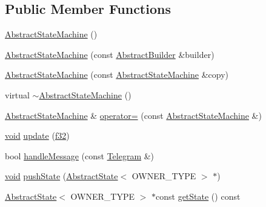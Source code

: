 \subsection*{Public Member Functions}
\begin{DoxyCompactItemize}
\item 
\mbox{\hyperlink{classnjli_1_1_abstract_state_machine_a9656442a1a93737e55b72cdb3f7f6cfd}{Abstract\+State\+Machine}} ()
\item 
\mbox{\hyperlink{classnjli_1_1_abstract_state_machine_a653f5257533125711c79d054265b1fa6}{Abstract\+State\+Machine}} (const \mbox{\hyperlink{classnjli_1_1_abstract_builder}{Abstract\+Builder}} \&builder)
\item 
\mbox{\hyperlink{classnjli_1_1_abstract_state_machine_abf78c27c17c84ed7e6e372714e7a87fc}{Abstract\+State\+Machine}} (const \mbox{\hyperlink{classnjli_1_1_abstract_state_machine}{Abstract\+State\+Machine}} \&copy)
\item 
virtual \mbox{\hyperlink{classnjli_1_1_abstract_state_machine_af05bef63fdcbaedd01df2657fe9b1e7b}{$\sim$\+Abstract\+State\+Machine}} ()
\item 
\mbox{\hyperlink{classnjli_1_1_abstract_state_machine}{Abstract\+State\+Machine}} \& \mbox{\hyperlink{classnjli_1_1_abstract_state_machine_af5d1c414f2ac3aba89c076461b404271}{operator=}} (const \mbox{\hyperlink{classnjli_1_1_abstract_state_machine}{Abstract\+State\+Machine}} \&)
\item 
\mbox{\hyperlink{_thread_8h_af1e856da2e658414cb2456cb6f7ebc66}{void}} \mbox{\hyperlink{classnjli_1_1_abstract_state_machine_af975fdfd08f9f6d93d739b12d1a06e52}{update}} (\mbox{\hyperlink{_util_8h_a5f6906312a689f27d70e9d086649d3fd}{f32}})
\item 
bool \mbox{\hyperlink{classnjli_1_1_abstract_state_machine_a7741c8bc8e0bf7d3d1b1e5310be6b5eb}{handle\+Message}} (const \mbox{\hyperlink{classnjli_1_1_telegram}{Telegram}} \&)
\item 
\mbox{\hyperlink{_thread_8h_af1e856da2e658414cb2456cb6f7ebc66}{void}} \mbox{\hyperlink{classnjli_1_1_abstract_state_machine_a0ef8fbf451f61eaccc97319751fe76c3}{push\+State}} (\mbox{\hyperlink{classnjli_1_1_abstract_state}{Abstract\+State}}$<$ O\+W\+N\+E\+R\+\_\+\+T\+Y\+PE $>$ $\ast$)
\item 
\mbox{\hyperlink{classnjli_1_1_abstract_state}{Abstract\+State}}$<$ O\+W\+N\+E\+R\+\_\+\+T\+Y\+PE $>$ $\ast$const \mbox{\hyperlink{classnjli_1_1_abstract_state_machine_a026a33bc918f423304b442e0dfaa046e}{get\+State}} () const
\item 

\end{DoxyCompactItemize}
